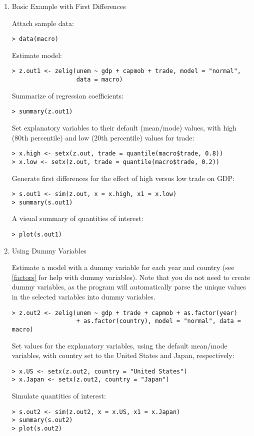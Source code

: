 \begin{enumerate}
\item Basic Example with First Differences

Attach sample data: 
\begin{verbatim}
> data(macro)
\end{verbatim}
Estimate model:  
\begin{verbatim}
> z.out1 <- zelig(unem ~ gdp + capmob + trade, model = "normal", 
                  data = macro)
\end{verbatim}
Summarize of regression coefficients:  
\begin{verbatim}
> summary(z.out1)
\end{verbatim}
Set explanatory variables to their default (mean/mode) values, with
high (80th percentile) and low (20th percentile) values for trade: 
\begin{verbatim} 
> x.high <- setx(z.out, trade = quantile(macro$trade, 0.8))
> x.low <- setx(z.out, trade = quantile(macro$trade, 0.2))
\end{verbatim}
Generate first differences for the effect of high versus low trade on
GDP: 
\begin{verbatim}
> s.out1 <- sim(z.out, x = x.high, x1 = x.low)
> summary(s.out1)
\end{verbatim}
A visual summary of quantities of interest:  
\begin{verbatim}
> plot(s.out1)
\end{verbatim}

\item Using Dummy Variables

Estimate a model with a dummy variable for each year and country (see
\ref{factors} for help with dummy variables).  Note that you do not
need to create dummy variables, as the program will automatically
parse the unique values in the selected variables into dummy
variables.    
\begin{verbatim}
> z.out2 <- zelig(unem ~ gdp + trade + capmob + as.factor(year) 
                  + as.factor(country), model = "normal", data = macro)
\end{verbatim}
Set values for the explanatory variables, using the default mean/mode
variables, with country set to the United States and Japan,
respectively: 
\begin{verbatim}
> x.US <- setx(z.out2, country = "United States")
> x.Japan <- setx(z.out2, country = "Japan")
\end{verbatim}
Simulate quantities of interest:  
\begin{verbatim}
> s.out2 <- sim(z.out2, x = x.US, x1 = x.Japan)
> summary(s.out2)
> plot(s.out2)
\end{verbatim}
\end{enumerate}

